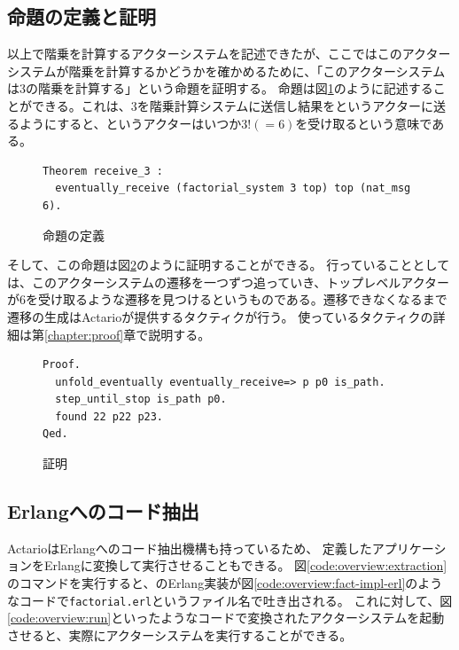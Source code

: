 \subsection{命題の定義と証明}

以上で階乗を計算するアクターシステムを記述できたが、ここではこのアクターシステムが階乗を計算するかどうかを確かめるために、「このアクターシステムは3の階乗を計算する」という命題を証明する。
命題は図\ref{code:overview:fact-spec}のように記述することができる。これは、$3$を階乗計算システムに送信し結果をというアクターに送るようにすると、というアクターはいつか$3! (= 6)$を受け取るという意味である。

\begin{figure}[tp]
\begin{lstlisting}
Theorem receive_3 :
  eventually_receive (factorial_system 3 top) top (nat_msg 6).
\end{lstlisting}
\label{code:overview:fact-spec}
\caption{命題の定義}
\end{figure}

そして、この命題は図\ref{code:overview:fact-proof}のように証明することができる。
行っていることとしては、このアクターシステムの遷移を一つずつ追っていき、トップレベルアクターが$6$を受け取るような遷移を見つけるというものである。遷移できなくなるまで遷移の生成はActarioが提供するタクティクが行う。
使っているタクティクの詳細は第\ref{chapter:proof}章で説明する。

\begin{figure}[tp]
\begin{lstlisting}
Proof.
  unfold_eventually eventually_receive=> p p0 is_path.
  step_until_stop is_path p0.
  found 22 p22 p23.
Qed.
\end{lstlisting}
  \label{code:overview:fact-proof}
  \caption{証明}
\end{figure}


\subsection{Erlangへのコード抽出}

ActarioはErlangへのコード抽出機構も持っているため、
定義したアプリケーションをErlangに変換して実行させることもできる。
図\ref{code:overview:extraction}のコマンドを実行すると、のErlang実装が図\ref{code:overview:fact-impl-erl}のようなコードで\texttt{factorial.erl}というファイル名で吐き出される。
これに対して、図\ref{code:overview:run}といったようなコードで変換されたアクターシステムを起動させると、実際にアクターシステムを実行することができる。

